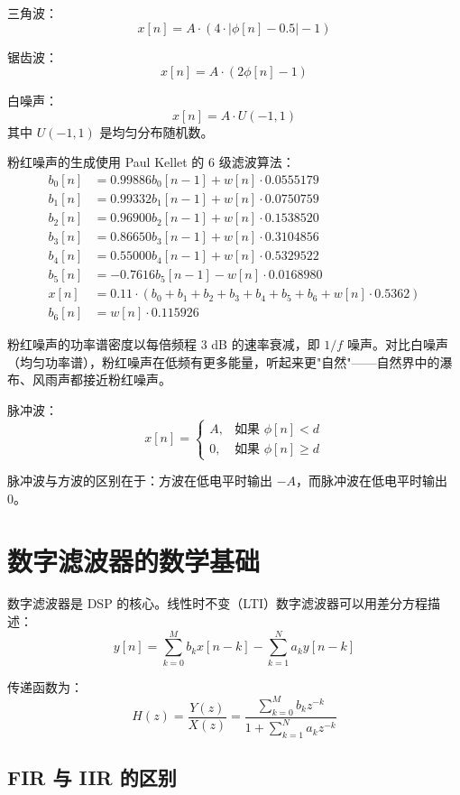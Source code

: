 ﻿\documentclass[12pt,a4paper,oneside]{ctexbook}
\begin{document}
三角波：
\[
x[n] = A \cdot (4 \cdot |\phi[n] - 0.5| - 1)
\]

锯齿波：
\[
x[n] = A \cdot (2\phi[n] - 1)
\]

白噪声：
\[
x[n] = A \cdot U(-1, 1)
\]
其中 \(U(-1, 1)\) 是均匀分布随机数。

粉红噪声的生成使用 Paul Kellet 的 6 级滤波算法：
\[
\begin{aligned}
b_0[n] &= 0.99886 b_0[n-1] + w[n] \cdot 0.0555179 \\
b_1[n] &= 0.99332 b_1[n-1] + w[n] \cdot 0.0750759 \\
b_2[n] &= 0.96900 b_2[n-1] + w[n] \cdot 0.1538520 \\
b_3[n] &= 0.86650 b_3[n-1] + w[n] \cdot 0.3104856 \\
b_4[n] &= 0.55000 b_4[n-1] + w[n] \cdot 0.5329522 \\
b_5[n] &= -0.7616 b_5[n-1] - w[n] \cdot 0.0168980 \\
x[n] &= 0.11 \cdot (b_0 + b_1 + b_2 + b_3 + b_4 + b_5 + b_6 + w[n] \cdot 0.5362) \\
b_6[n] &= w[n] \cdot 0.115926
\end{aligned}
\]

粉红噪声的功率谱密度以每倍频程 3 dB 的速率衰减，即 \(1/f\) 噪声。对比白噪声（均匀功率谱），粉红噪声在低频有更多能量，听起来更"自然"——自然界中的瀑布、风雨声都接近粉红噪声。

脉冲波：
\[
x[n] = \begin{cases}
A, & \text{如果 } \phi[n] < d \\
0, & \text{如果 } \phi[n] \geq d
\end{cases}
\]

脉冲波与方波的区别在于：方波在低电平时输出 \(-A\)，而脉冲波在低电平时输出 0。

\section{数字滤波器的数学基础}

数字滤波器是 DSP 的核心。线性时不变（LTI）数字滤波器可以用差分方程描述：
\[
y[n] = \sum_{k=0}^{M} b_k x[n-k] - \sum_{k=1}^{N} a_k y[n-k]
\]

传递函数为：
\[
H(z) = \frac{Y(z)}{X(z)} = \frac{\sum_{k=0}^{M} b_k z^{-k}}{1 + \sum_{k=1}^{N} a_k z^{-k}}
\]

\subsection{FIR 与 IIR 的区别}
\end{document}
